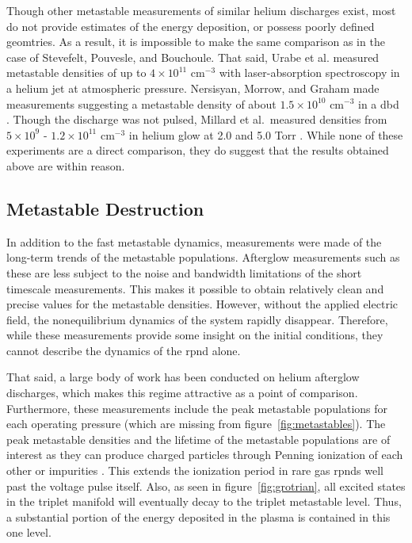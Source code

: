 Though other metastable measurements of similar helium discharges exist, most do
not provide estimates of the energy deposition, or possess poorly defined
geomtries. As a result, it is impossible to make the same comparison as in the
case of Stevefelt, Pouvesle, and Bouchoule. That said, Urabe et al.
\cite{Urabe2010} measured metastable densities of up to $4\times10^{11}$
cm$^{-3}$ with laser-absorption spectroscopy in a helium jet at atmospheric
pressure. Nersisyan, Morrow, and Graham made measurements suggesting a
metastable density of about $1.5\times10^{10}$ cm$^{-3}$ in a \acs{dbd}
\cite{Nersisyan2004}. Though the discharge was not pulsed, Millard et al.\
measured densities from $5\times10^9$ - $1.2\times10^{11}$ cm$^{-3}$ in helium
glow at 2.0 and 5.0 Torr \cite{Millard1998}. While none of these experiments are
a direct comparison, they do suggest that the results obtained above are within
reason.

\subsection{Metastable Destruction}

In addition to the fast metastable dynamics, measurements were made of the
long-term trends of the metastable populations. Afterglow measurements such as
these are less subject to the noise and bandwidth limitations of the short
timescale measurements. This makes it possible to obtain relatively clean and
precise values for the metastable densities. However, without the applied
electric field, the nonequilibrium dynamics of the system rapidly disappear.
Therefore, while these measurements provide some insight on the initial
conditions, they cannot describe the dynamics of the \acs{rpnd} alone.

That said, a large body of work has been conducted on helium afterglow
discharges, which makes this regime attractive as a point of comparison.
Furthermore, these measurements include the peak metastable populations for each
operating pressure (which are missing from figure~\ref{fig:metastables}). The
peak metastable densities and the lifetime of the metastable populations are of
interest as they can produce charged particles through Penning ionization of
each other or impurities \cite{Nersisyan2004}. This extends the ionization
period in rare gas \acs{rpnd}s well past the voltage pulse itself. Also, as seen
in figure~\ref{fig:grotrian}, all excited states in the triplet manifold will
eventually decay to the triplet metastable level. Thus, a substantial portion of
the energy deposited in the plasma is contained in this one level.

